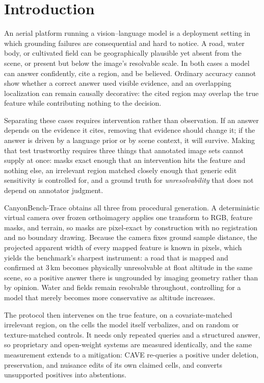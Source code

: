 \section{Introduction}
An aerial platform running a vision--language model is a deployment setting in
which grounding failures are consequential and hard to notice. A road, water
body, or cultivated field can be geographically plausible yet absent from the
scene, or present but below the image's resolvable scale. In both cases a model
can answer confidently, cite a region, and be believed. Ordinary accuracy cannot
show whether a correct answer used visible evidence, and an overlapping
localization can remain causally decorative: the cited region may overlap the
true feature while contributing nothing to the decision.

Separating these cases requires intervention rather than observation. If an
answer depends on the evidence it cites, removing that evidence should change
it; if the answer is driven by a language prior or by scene context, it will
survive. Making that test trustworthy requires three things that annotated
image sets cannot supply at once: masks exact enough that an intervention hits
the feature and nothing else, an irrelevant region matched closely enough that
generic edit sensitivity is controlled for, and a ground truth for
\emph{unresolvability} that does not depend on annotator judgment.

CanyonBench-Trace obtains all three from procedural generation. A deterministic
virtual camera over frozen orthoimagery applies one transform to RGB, feature
masks, and terrain, so masks are pixel-exact by construction with no
registration and no boundary drawing. Because the camera fixes ground sample
distance, the projected apparent width of every mapped feature is known in
pixels, which yields the benchmark's sharpest instrument: a road that is mapped
and confirmed at 3\,km becomes physically unresolvable at float altitude in the
same scene, so a positive answer there is ungrounded by imaging geometry rather
than by opinion. Water and fields remain resolvable throughout, controlling for
a model that merely becomes more conservative as altitude increases.

The protocol then intervenes on the true feature, on a covariate-matched
irrelevant region, on the cells the model itself verbalizes, and on random or
texture-matched controls. It needs only repeated queries and a structured
answer, so proprietary and open-weight systems are measured identically, and the
same measurement extends to a mitigation: CAVE re-queries a positive under
deletion, preservation, and nuisance edits of its own claimed cells, and
converts unsupported positives into abstentions.

